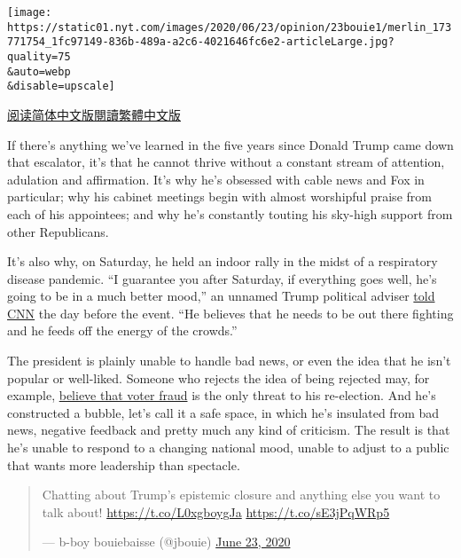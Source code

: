 \texttt{[image: https://static01.nyt.com/images/2020/06/23/opinion/23bouie1/merlin\_173771754\_1fc97149-836b-489a-a2c6-4021646fc6e2-articleLarge.jpg?quality=75\\\&auto=webp\\\&disable=upscale]}

\href{https://cn.nytimes.com/opinion/20200624/maga-trump-fake-news/}{阅读简体中文版}\href{https://cn.nytimes.com/opinion/20200624/maga-trump-fake-news/zh-hant/}{閱讀繁體中文版}

If there's anything we've learned in the five years since Donald Trump
came down that escalator, it's that he cannot thrive without a constant
stream of attention, adulation and affirmation. It's why he's obsessed
with cable news and Fox in particular; why his cabinet meetings begin
with almost worshipful praise from each of his appointees; and why he's
constantly touting his sky-high support from other Republicans.

It's also why, on Saturday, he held an indoor rally in the midst of a
respiratory disease pandemic. ``I guarantee you after Saturday, if
everything goes well, he's going to be in a much better mood,'' an
unnamed Trump political adviser
\href{https://www.cnn.com/2020/06/19/politics/trump-turn-around-losing-campaign/index.html}{told
CNN} the day before the event. ``He believes that he needs to be out
there fighting and he feeds off the energy of the crowds.''

The president is plainly unable to handle bad news, or even the idea
that he isn't popular or well-liked. Someone who rejects the idea of
being rejected may, for example,
\href{https://twitter.com/realdonaldtrump/status/1275024974579982336?s=21}{believe
that voter fraud} is the only threat to his re-election. And he's
constructed a bubble, let's call it a safe space, in which he's
insulated from bad news, negative feedback and pretty much any kind of
criticism. The result is that he's unable to respond to a changing
national mood, unable to adjust to a public that wants more leadership
than spectacle.

\begin{quote}
Chatting about Trump's epistemic closure and anything else you want to
talk about! \href{https://t.co/L0xgboygJa}{https://t.co/L0xgboygJa}
\href{https://t.co/sE3jPqWRp5}{https://t.co/sE3jPqWRp5}

--- b-boy bouiebaisse (@jbouie)
\href{https://twitter.com/jbouie/status/1275477105204051969?ref_src=twsrc\%5Etfw}{June
23, 2020}
\end{quote}

